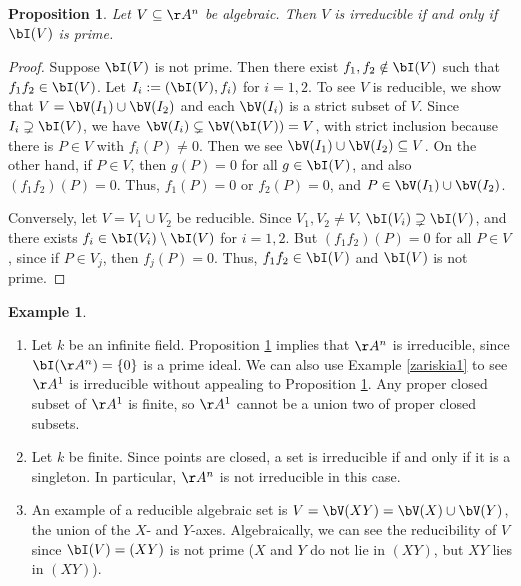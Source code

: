\documentclass[12pt]{amsart}
\theoremstyle{plain}
\newtheorem{proposition}[theorem]{Proposition}
\theoremstyle{definition}
\newtheorem{example}[theorem]{Example}
\begin{document}
\begin{proposition}\label{irreducibilityproposition}
Let $V \subseteq \AA^n$ be algebraic.
Then $V$ is irreducible if and only if $\bI(V)$ is prime.
\end{proposition}
\begin{proof}
Suppose $\bI(V)$ is not prime.
Then there exist $f_1, f_2 \notin \bI(V)$ such that $f_1 f_2 \in \bI(V)$.
Let $I_i := (\bI(V), f_i)$ for $i=1, 2$.
To see $V$ is reducible, we show that $V = \bV(I_1) \cup \bV(I_2)$ and each $\bV(I_i)$ is a strict subset of $V$.
Since $I_i \supsetneq \bI(V)$, we have $\bV(I_i) \subsetneq \bV(\bI(V)) = V$, with strict inclusion because there is $P \in V$ with $f_i(P) \ne 0$.
Then we see $\bV(I_1) \cup \bV(I_2) \subseteq V$.
On the other hand, if $P \in V$, then $g(P) = 0$ for all $g \in \bI(V)$, and also $(f_1 f_2)(P) = 0$.
Thus, $f_1(P) = 0$ or $f_2(P)=0$, and $P \in \bV(I_1) \cup \bV(I_2)$.

Conversely, let $V = V_1 \cup V_2$ be reducible.
Since $V_1, V_2 \ne V$, $\bI(V_i) \supsetneq \bI(V)$, and there exists $f_i \in \bI(V_i) \setminus \bI(V)$ for $i=1,2$.
But $(f_1 f_2)(P) = 0$ for all $P \in V$, since if $P \in V_j$, then $f_j(P) = 0$.
Thus, $f_1 f_2 \in \bI(V)$ and $\bI(V)$ is not prime.
\end{proof}

\begin{example}
\begin{enumerate}
\item
Let $k$ be an infinite field.
Proposition \ref{irreducibilityproposition} implies that $\AA^n$ is irreducible, since $\bI(\AA^n) = \{0\}$ is a prime ideal.
We can also use Example \ref{zariskia1} to see $\AA^1$ is irreducible without appealing to Proposition \ref{irreducibilityproposition}.
Any proper closed subset of $\AA^1$ is finite, so $\AA^1$ cannot be a union two of proper closed subsets.

\item
Let $k$ be finite.
Since points are closed, a set is irreducible if and only if it is a singleton.
In particular, $\AA^n$ is not irreducible in this case.

\item
An example of a reducible algebraic set is $V = \bV(XY) = \bV(X) \cup \bV(Y)$, the union of the $X$- and $Y$-axes.
Algebraically, we can see the reducibility of $V$ since $\bI(V) = (XY)$ is not prime
($X$ and $Y$ do not lie in $(XY)$, but $XY$ lies in $(XY)$).
\end{enumerate}
\end{example}
\end{document}
